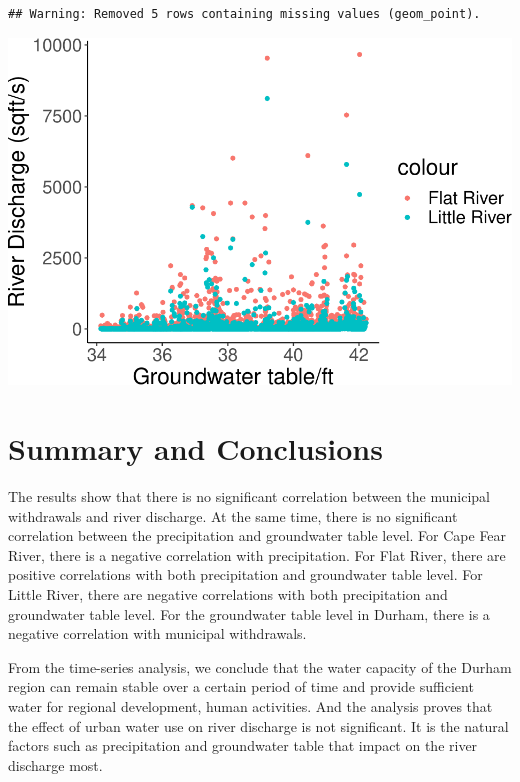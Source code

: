 \documentclass[
  12pt,
]{article}
\begin{document}
\begin{verbatim}
## Warning: Removed 5 rows containing missing values (geom_point).
\end{verbatim}

\includegraphics{Project_files/figure-latex/groundwater and river discharge-2.pdf}

\newpage

\hypertarget{summary-and-conclusions}{%
\section{Summary and Conclusions}\label{summary-and-conclusions}}

The results show that there is no significant correlation between the
municipal withdrawals and river discharge. At the same time, there is no
significant correlation between the precipitation and groundwater table
level. For Cape Fear River, there is a negative correlation with
precipitation. For Flat River, there are positive correlations with both
precipitation and groundwater table level. For Little River, there are
negative correlations with both precipitation and groundwater table
level. For the groundwater table level in Durham, there is a negative
correlation with municipal withdrawals.

From the time-series analysis, we conclude that the water capacity of
the Durham region can remain stable over a certain period of time and
provide sufficient water for regional development, human activities. And
the analysis proves that the effect of urban water use on river
discharge is not significant. It is the natural factors such as
precipitation and groundwater table that impact on the river discharge
most.
\end{document}
